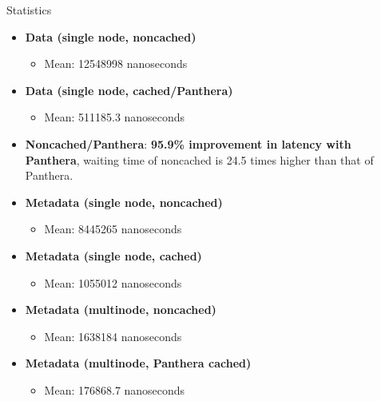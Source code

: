 \documentclass[final]{beamer} %
\begin{document}
\begin{frame}
\begin{columns}[t]
\begin{column}{0.32\textwidth}
    \begin{block}{Statistics}
    \begin{itemize}
    		\item \textbf{Data (single node, noncached)}
    		\begin{itemize}
    			\item Mean: 12548998 nanoseconds
    		\end{itemize}
    		\item \textbf{Data (single node, cached/Panthera)}
    		\begin{itemize}
    			\item Mean: 511185.3 nanoseconds
    		\end{itemize}
    		\item \textbf{Noncached/Panthera}: \textbf{95.9\% improvement in latency with Panthera}, waiting time of noncached is 24.5 times higher than that of Panthera.
    		
    		\item \textbf{Metadata (single node, noncached)}
    		\begin{itemize}
    			\item Mean: 8445265 nanoseconds
    		\end{itemize}
    		
    		\item \textbf{Metadata (single node, cached)}
    		\begin{itemize}
    			\item Mean: 1055012 nanoseconds
    		\end{itemize}
    		
    		\item \textbf{Metadata (multinode, noncached)}
		\begin{itemize}
			\item Mean: 1638184 nanoseconds    		
    		\end{itemize}
    		
    		\item \textbf{Metadata (multinode, Panthera cached)}
    		\begin{itemize}
			\item Mean: 176868.7 nanoseconds    		
    		\end{itemize}
    		

\end{itemize}
\end{block}
\end{column}
\end{columns}
\end{frame}
\end{document}

